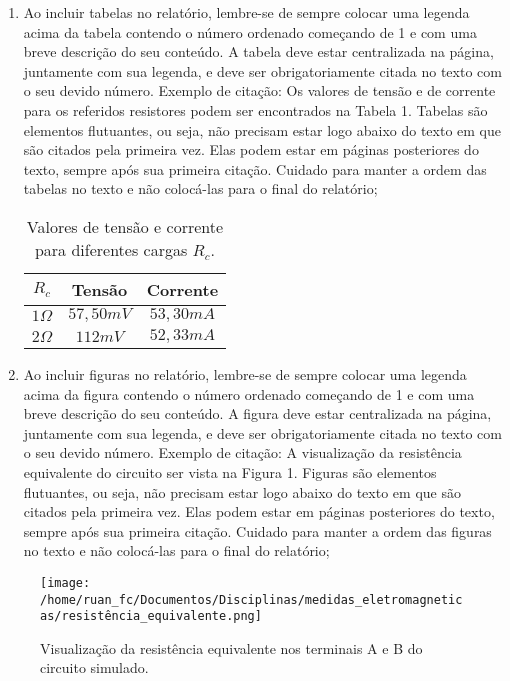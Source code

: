 \documentclass[12pt]{article}
\begin{document}
\begin{enumerate}
\item Ao incluir tabelas no relatório, lembre-se de sempre colocar uma legenda acima da tabela contendo o número ordenado começando de 1 e com uma breve descrição do seu conteúdo. A tabela deve estar centralizada na página, juntamente com sua legenda, e deve ser obrigatoriamente citada no texto com o seu devido número. Exemplo de citação: Os valores de tensão e de corrente para os referidos resistores podem ser encontrados na Tabela 1. Tabelas são elementos flutuantes, ou seja, não precisam estar logo abaixo do texto em que são citados pela primeira vez. Elas podem estar em páginas posteriores do texto, sempre após sua primeira citação. Cuidado para manter a ordem das tabelas no texto e não colocá-las para o final do relatório;
\begin{table}[htbp]
\caption{\label{valores}Valores de tensão e corrente para diferentes cargas \(R_c\).}
\centering
\begin{tabular}{|c|c|c|}
\hline
\(R_c\) & Tensão & Corrente\\
\hline
\(1 \Omega\) & \(57,50 mV\) & \(53,30 mA\)\\
\hline
\(2 \Omega\) & \(112 mV\) & \(52,33 mA\)\\
\hline
\end{tabular}
\end{table}

\setcounter{enumi}{11}
\item Ao incluir figuras no relatório, lembre-se de sempre colocar uma legenda acima da figura contendo o número ordenado começando de 1 e com uma breve descrição do seu conteúdo. A figura deve estar centralizada na página, juntamente com sua legenda, e deve ser obrigatoriamente citada no texto com o seu devido número. Exemplo de citação: A visualização da resistência equivalente do circuito ser vista na Figura 1. Figuras são elementos flutuantes, ou seja, não precisam estar logo abaixo do texto em que são citados pela primeira vez. Elas podem estar em páginas posteriores do texto, sempre após sua primeira citação. Cuidado para manter a ordem das figuras no texto e não colocá-las para o final do relatório;
\end{enumerate}
\begin{figure}[htbp]
\caption{\label{fig:resistência_equivalente}Visualização da resistência equivalente nos terminais A e B do circuito simulado.}
\centering
\texttt{[image: /home/ruan\_fc/Documentos/Disciplinas/medidas\_eletromagneticas/resistência\_equivalente.png]}
\end{figure}
\end{document}
